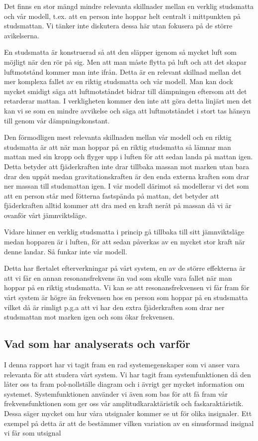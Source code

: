 \documentclass[10pt,a4paper]{article}
\begin{document}
Det finns en stor mängd mindre relevanta skillnader mellan en verklig studsmatta och vår modell, t.ex. att en person inte hoppar helt centralt i mittpunkten på studsmattan. Vi tänker inte diskutera dessa här utan fokusera på de större avikelserna.

En studsmatta är konstruerad så att den släpper igenom så mycket luft som möjligt när den rör på sig. Men att man måste flytta på luft och att det skapar luftmotstånd kommer man inte ifrån. Detta är en relevant skillnad mellan det mer komplexa fallet av en riktig studsmatta och vår modell. Man kan dock mycket smidigt säga att luftmotståndet bidrar till dämpningen eftersom att det retarderar mattan. I verkligheten kommer den inte att göra detta linjärt men det kan vi se som en mindre avvikelse och säga att luftmotståndet i stort tas hänsyn till genom vår dämpningskonstant.

Den förmodligen mest relevanta skillnaden mellan vår modell och en riktig studsmatta är att när man hoppar på en riktig studsmatta så lämnar man mattan med sin kropp och flyger upp i luften för att sedan landa på mattan igen. Detta betyder att fjäderkraften inte drar tillbaka massan mot marken utan bara drar den uppåt medan gravitationskraften är den enda externa kraften som drar ner massan till studsmattan igen. I vår modell därimot så modellerar vi det som att en person står med fötterna fastspända på mattan, det betyder att fjäderkraften alltid kommer att dra med en kraft neråt på massan då vi är ovanför vårt jämnviktsläge.

Vidare hinner en verklig studsmatta i princip gå tillbaka till sitt jämnviktsläge medan hopparen är i luften, för att sedan påverkas av en mycket stor kraft när denne landar. Så funkar inte vår modell.

Detta har flertalet efterverkningar på vårt system, en av de större effekterna är att vi får en annan resonansfrekvens än vad som skulle vara fallet när man hoppar på en riktig studsmatta. Vi kan se att resonansfrekvensen vi får fram för vårt system är högre än frekvensen hos en person som hoppar på en studsmatta vilket då är rimligt p.g.a att vi har den extra fjäderkraften som drar ner studsmattan mot marken igen och som ökar frekvensen.

\subsection{Vad som har analyserats och varför}

I denna rapport har vi tagit fram en rad systemegenskaper som vi anser vara relevanta för att studera vårt system. Vi har tagit fram systemfunktionen då den låter oss ta fram pol-nollställe diagram och i ävrigt ger mycket information om systemet. Systemfunktionen använder vi även som bas för att få fram vår frekvensfunktionen som ger oss vår  amplitudkaraktäristik och faskaraktäristik. Dessa säger mycket om hur våra utsignaler kommer se ut för olika insignaler. Ett exempel på detta är att de bestämmer vilken variation av en sinusformad insignal vi får som utsignal
\end{document}
